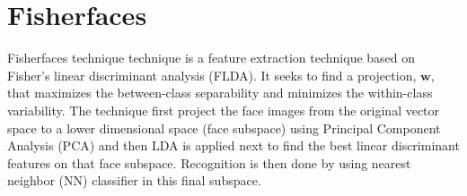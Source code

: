 



\section{Fisherfaces}
Fisherfaces technique technique is a feature extraction technique based on Fisher's linear discriminant analysis (FLDA). It seeks to find a projection, $\mathbf{w}$, that maximizes the between-class separability and minimizes the within-class variability. The technique first project the face images from the original vector space to a lower dimensional space (face subspace) using Principal Component Analysis (PCA) and then LDA is applied next to find the best linear discriminant features on that face subspace. Recognition is then done by using nearest neighbor (NN) classifier in this final subspace.


